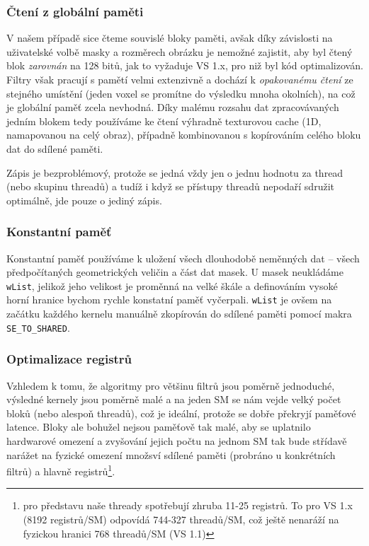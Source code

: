         \subsubsection{Čtení z globální paměti}\label{globální pam opt}

        V našem případě sice čteme souvislé bloky paměti, avšak díky závislosti na uživatelské volbě masky a rozměrech obrázku je nemožné zajistit, aby byl čtený blok \emph{zarovnán} na 128 bitů, jak to vyžaduje VS 1.x, pro niž byl kód optimalizován. Filtry však pracují s pamětí velmi extenzivně a dochází k \emph{opakovanému čtení} ze stejného umístění (jeden voxel se promítne do výsledku mnoha okolních), na což je globální paměť zcela nevhodná. Díky malému rozsahu dat zpracovávaných jedním blokem tedy používáme ke čtení výhradně texturovou cache (1D, namapovanou na celý obraz), případně kombinovanou s kopírováním celého bloku dat do sdílené paměti.

        Zápis je bezproblémový, protože se jedná vždy jen o jednu hodnotu za thread (nebo skupinu threadů) a tudíž i když se přístupy threadů nepodaří sdružit optimálně, jde pouze o jediný zápis.

        \subsubsection{Konstantní paměť}

        Konstantní paměť používáme k uložení všech dlouhodobě neměnných dat -- všech předpočítaných geometrických veličin a část dat masek. U masek neukládáme {\tt wList}, jelikož jeho velikost je proměnná na velké škále a definováním vysoké horní hranice bychom rychle konstatní paměť vyčerpali. {\tt wList} je ovšem na začátku každého kernelu manuálně zkopírován do sdílené paměti pomocí makra {\tt SE\_TO\_SHARED}.

        \subsubsection{Optimalizace registrů}

        Vzhledem k tomu, že algoritmy pro většinu filtrů jsou poměrně jednoduché, výsledné kernely jsou poměrně malé a na jeden SM se nám vejde velký počet bloků (nebo alespoň threadů), což je ideální, protože se dobře překryjí paměťové latence. Bloky ale bohužel nejsou paměťově tak malé, aby se uplatnilo hardwarové omezení a zvyšování jejich počtu na jednom SM tak bude střídavě narážet na fyzické omezení množsví sdílené paměti (probráno u konkrétních filtrů) a hlavně registrů\footnote{pro představu naše thready spotřebují zhruba 11-25 registrů. To pro VS 1.x (8192 registrů/SM) odpovídá 744-327 threadů/SM, což ještě nenaráží na fyzickou hranici 768 threadů/SM (VS 1.1)}.

